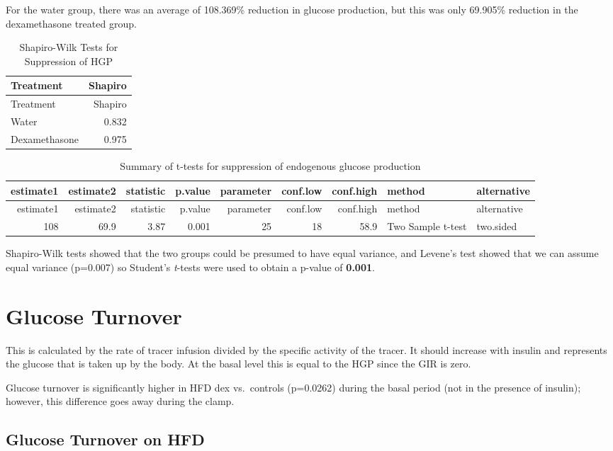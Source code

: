 \documentclass[]{article}
\begin{document}
For the water group, there was an average of 108.369\% reduction in
glucose production, but this was only 69.905\% reduction in the
dexamethasone treated group.

\begin{longtable}[]{@{}lr@{}}
\caption{Shapiro-Wilk Tests for Suppression of HGP}\tabularnewline
\toprule
Treatment & Shapiro\tabularnewline
\midrule
\endfirsthead
\toprule
Treatment & Shapiro\tabularnewline
\midrule
\endhead
Water & 0.832\tabularnewline
Dexamethasone & 0.975\tabularnewline
\bottomrule
\end{longtable}

\begin{longtable}[]{@{}rrrrrrrll@{}}
\caption{Summary of t-tests for suppression of endogenous glucose
production}\tabularnewline
\toprule
estimate1 & estimate2 & statistic & p.value & parameter & conf.low &
conf.high & method & alternative\tabularnewline
\midrule
\endfirsthead
\toprule
estimate1 & estimate2 & statistic & p.value & parameter & conf.low &
conf.high & method & alternative\tabularnewline
\midrule
\endhead
108 & 69.9 & 3.87 & 0.001 & 25 & 18 & 58.9 & Two Sample t-test &
two.sided\tabularnewline
\bottomrule
\end{longtable}

Shapiro-Wilk tests showed that the two groups could be presumed to have
equal variance, and Levene's test showed that we can assume equal
variance (p=0.007) so Student's \emph{t}-tests were used to obtain a
p-value of \textbf{0.001}.

\section{Glucose Turnover}\label{glucose-turnover}

This is calculated by the rate of tracer infusion divided by the
specific activity of the tracer. It should increase with insulin and
represents the glucose that is taken up by the body. At the basal level
this is equal to the HGP since the GIR is zero.

Glucose turnover is significantly higher in HFD dex vs.~controls
(p=0.0262) during the basal period (not in the presence of insulin);
however, this difference goes away during the clamp.

\subsection{Glucose Turnover on HFD}\label{glucose-turnover-on-hfd}
\end{document}
